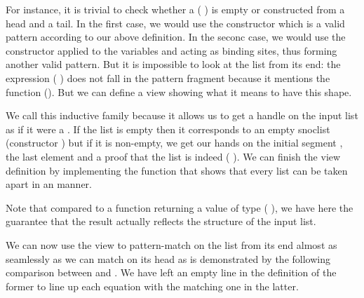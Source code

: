 For instance, it is trivial to check whether a ( )
is empty or constructed from a head and a tail.
%
In the first case, we would use the constructor  which is a valid
pattern according to our above definition.
%
In the seconc case, we would use the constructor \IdrisData{(::)} applied to the
variables  and  acting as binding sites, thus
forming another valid pattern.
%
But it is impossible to look at the list from its end: the expression
( \IdrisFunction{++} \IdrisData{[}\IdrisData{]})
does not fall in the pattern fragment because it mentions the function (\IdrisFunction{++}).
But we can define a view showing what it means to have this shape.


We call this inductive family  because it allows us to get
a handle on the input list as if it were a . If the list is
empty then it corresponds to an empty snoclist (constructor )
but if it is non-empty, we get our hands on the initial segment ,
the last element  and a proof that the list is indeed
( \IdrisFunction{++} \IdrisData{[}\IdrisData{]}).
%
We can finish the view definition by implementing the function 
that shows that every list  can be taken apart in an 
manner.


Note that compared to a function returning a value of type
{ ( \IdrisType{,} )},
we have here the guarantee that the result actually reflects the structure of the
input list.

We can now use the view to pattern-match on the list from its end almost as
seamlessly as we can match on its head as is demonstrated by the following
comparison between  and .
%
We have left an empty line in the definition of the former to line up each
equation with the matching one in the latter.

\begin{minipage}[t]{0.45\textwidth}
\end{minipage}
\begin{minipage}[t]{0.55\textwidth}
\end{minipage}

